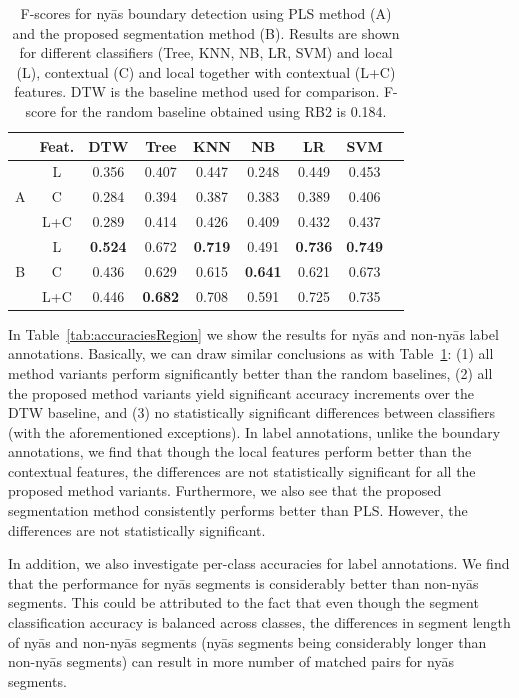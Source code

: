 {{\begin{table}
\begin{tabular}{ c|c|c| c c c c c c }
		\hline\hline
		& Feat.		&	DTW & Tree	 &	KNN 	&	NB		& LR 	&	SVM\\
		
		\hline
		\multirow{3}{*}{A} & 	L		&  0.356 & 0.407 & 0.447 & 0.248 & 0.449 & 0.453\\ 
		&	C		& 0.284 & 0.394 & 0.387 & 0.383 & 0.389 & 0.406 \\
		&	L+C		& 0.289 & 0.414 & 0.426 & 0.409 &0.432 & 0.437 \\
		\hline  		
		\multirow{3}{*}{B} &	L		& \textbf{0.524} & 0.672 & \textbf{0.719} & 0.491 & \textbf{0.736} & \textbf{0.749}\\ 
		&	C		& 0.436 & 0.629 & 0.615 & \textbf{0.641} & 0.621 & 0.673 \\
		&	L+C		& 0.446 & \textbf{0.682} & 0.708 & 0.591 & 0.725 & 0.735\\  		
		\hline\hline
		
	\end{tabular}
	
	\caption{F-scores for ny\={a}s boundary detection using PLS method (A) and the proposed segmentation method (B). Results are shown for different classifiers (Tree, KNN, NB, LR, SVM) and local (L), contextual (C) and local together with contextual (L+C) features. DTW is the baseline method used for comparison. F-score for the random baseline obtained using RB2 is 0.184. }
	\label{tab:accuraciesboundary}
\end{table}

In Table~\ref{tab:accuraciesRegion} we show the results for ny\={a}s and non-ny\={a}s label annotations. Basically, we can draw similar conclusions as with Table~\ref{tab:accuraciesboundary}: (1) all method variants perform significantly better than the random baselines, (2) all the proposed method variants yield significant accuracy increments over the DTW baseline, and (3) no statistically significant differences between classifiers (with the aforementioned exceptions). In label annotations, unlike the boundary annotations, we find that though the local features perform better than the contextual features, the differences are not statistically significant for all the proposed method variants. Furthermore, we also see that the proposed segmentation method consistently performs  better than PLS. However, the differences are not statistically significant.

In addition, we also investigate per-class accuracies for label annotations. We find that the performance for ny\={a}s segments is considerably better than non-ny\={a}s segments. This could be attributed to the fact that even though the segment classification accuracy is balanced across classes, the differences in segment length of ny\={a}s and non-ny\={a}s segments (ny\={a}s segments being considerably longer than non-ny\={a}s segments) can result in more number of matched pairs for ny\={a}s segments.

}}
